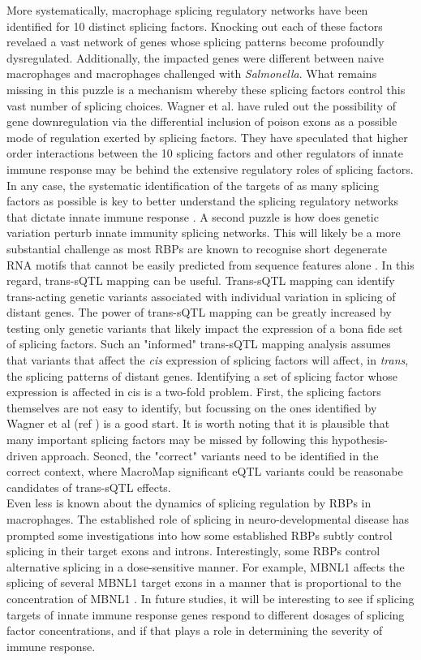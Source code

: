 More systematically, macrophage splicing regulatory networks have been identified for 10 distinct splicing factors. Knocking out each of these factors revelaed a vast network of genes whose splicing patterns become profoundly dysregulated. Additionally, the impacted genes were different between naive macrophages and macrophages challenged with \textit{Salmonella}. What remains missing in this puzzle is a mechanism whereby these splicing factors control this vast number of splicing choices. Wagner et al. have ruled out the possibility of gene downregulation via the differential inclusion of poison exons as a possible mode of regulation exerted by splicing factors. They have speculated that higher order interactions between the 10 splicing factors and other regulators of innate immune response may be behind the extensive regulatory roles of splicing factors. In any case, the systematic identification of the targets of as many splicing factors as possible is key to better understand the splicing regulatory networks that dictate innate immune response \cite{Wagner2016-kl}. A second puzzle is how does genetic variation perturb innate immunity splicing networks. This will likely be a more substantial challenge as most RBPs are known to recognise short degenerate RNA motifs that cannot be easily predicted from sequence features alone \cite{Cereda2014-ty}. In this regard, trans-sQTL mapping can be useful. Trans-sQTL mapping can identify trans-acting genetic variants associated with individual variation in splicing of distant genes. The power of trans-sQTL mapping can be greatly increased by testing only genetic variants that likely impact the expression of a bona fide set of splicing factors. Such an "informed" trans-sQTL mapping analysis assumes that variants that affect the \textit{cis} expression of splicing factors will affect, in \textit{trans}, the splicing patterns of distant genes. Identifying a set of splicing factor whose expression is affected in cis is a two-fold problem. First, the splicing factors themselves are not easy to identify, but focussing on the ones identified by Wagner et al (ref \cite{Wagner2016-kl}) is a good start. It is worth noting that it is plausible that many important splicing factors may be missed by following this hypothesis-driven approach. Seoncd, the "correct" variants need to be identified in the correct context, where MacroMap significant eQTL variants could be reasonabe candidates of trans-sQTL effects. \\ 

Even less is known about the dynamics of splicing regulation by RBPs in macrophages. The established role of splicing in neuro-developmental disease has prompted some investigations into how some established RBPs subtly control splicing in their target exons and introns. Interestingly, some RBPs control alternative splicing in a dose-sensitive manner. For example, MBNL1 affects the splicing of several MBNL1 target exons in a manner that is proportional to the concentration of MBNL1 \cite{Wagner2016-kl}. In future studies, it will be interesting to see if splicing targets of innate immune response genes respond to different dosages of splicing factor concentrations, and if that plays a role in determining the severity of immune response. \\

